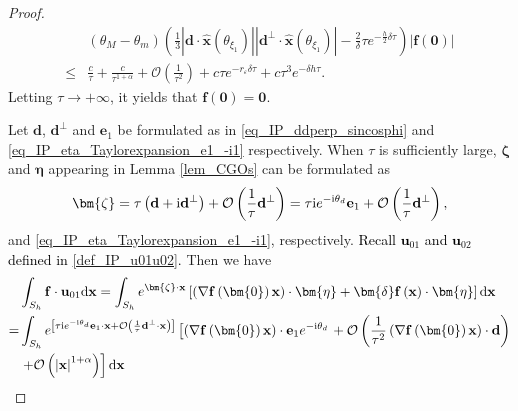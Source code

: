 \documentclass[11pt,reqno,oneside]{amsart}
\theoremstyle{definition}
\theoremstyle{remark}
\numberwithin{equation}{section}
\numberwithin{equation}{section}
\theoremstyle{remark}
\begin{document}
\begin{proof}
	\begin{align*} 
		&\left(\theta_M-\theta_m\right)\left(\frac{1}{3 }\left|\mathbf{d}\cdot\hat{\mathbf{x}} \left(\theta_{\xi_1}\right)\right| \left|\mathbf{d}^{\perp}\cdot\hat{\mathbf{x}} \left(\theta_{\xi_1}\right)\right| - \frac{2}{\delta}\tau e^{-\frac{h}{2} \delta \tau}\right) \left| \mathbf{f}\left(\bm{0}\right) \right| \\
		\leqslant &\frac{c}{\tau} +  \frac{c}{\tau^{1+\alpha}} + \mathcal{O}\left(\frac{1}{\tau^2}\right) + c\tau e^{-r_{\varepsilon} \delta \tau} + c \tau^3 e^{- \delta h \tau} .
	\end{align*}
	Letting $ \tau\to+\infty $, it yields that $ \mathbf{f} \left(\bm{0}\right) = \bm{0} $.
	
	Let $ \mathbf{d} $, $ \mathbf{d}^{\perp} $ and $ \mathbf{e}_1 $ be formulated as in \eqref{eq_IP_ddperp_sincosphi} and \eqref{eq_IP_eta_Taylorexpansion_e1_-i1} respectively. When $ \tau $ is sufficiently large, $ \bm{\zeta} $ and $ \bm{\eta} $ appearing in Lemma \ref{lem_CGOs} can be formulated as
	\begin{align}
		\bm{\zeta} = \tau \left( \mathbf{d} + \text{i} \mathbf{d}^{\perp} \right) + \mathcal{O} \left(\frac{1}{\tau}\mathbf{d}^{\perp}\right) = \tau \mathrm{i} e^{-\mathrm{i}\theta_d} \mathbf{e}_1  + \mathcal{O} \left(\frac{1}{\tau}\mathbf{d}^{\perp}\right), \notag
	\end{align}
	and \eqref{eq_IP_eta_Taylorexpansion_e1_-i1}, respectively. \textcolor{black}{Recall $\mathbf{u}_{01}$ and $\mathbf{u}_{02}$ defined in \eqref{def_IP_u01u02}.} Then we have
	\begin{align} \label{eq_intSh_fu01}
		& \int_{S_h} \mathbf{f} \cdot \mathbf{u}_{01} \mathrm{d}\mathbf{x} = \int_{S_h} e^{\bm{\zeta} \cdot \mathbf{x}} \left[\left(\nabla \mathbf{f} \left(\bm{0}\right) \mathbf{x}\right)\cdot\bm{\eta} + \bm{\delta} \mathbf{f}\left(\mathbf{x}\right)\cdot \bm{\eta}\right] \mathrm{d}\mathbf{x} \notag \\
		= & \int_{S_h} e^{\left[\tau \mathrm{i} e^{-\mathrm{i}\theta_d} \mathbf{e}_1 \cdot \mathbf{x} + \mathcal{O} \left(\frac{1}{\tau}\mathbf{d}^{\perp} \cdot \mathbf{x}\right)\right]}\left[ \left(\nabla \mathbf{f} \left(\bm{0}\right) \mathbf{x}\right)\cdot\mathbf{e}_1 e^{-\mathrm{i}\theta_d}\right. + \mathcal{O} \left(\frac{1}{\tau^2}\left(\nabla \mathbf{f} \left(\bm{0}\right) \mathbf{x}\right)\cdot\mathbf{d}\right)\notag \\
		& \left. + \mathcal{O}\left(\left|\mathbf{x}\right|^{1+\alpha}\right)\right] \mathrm{d}\mathbf{x} \notag \\

\end{align}
\end{proof}
\end{document}
